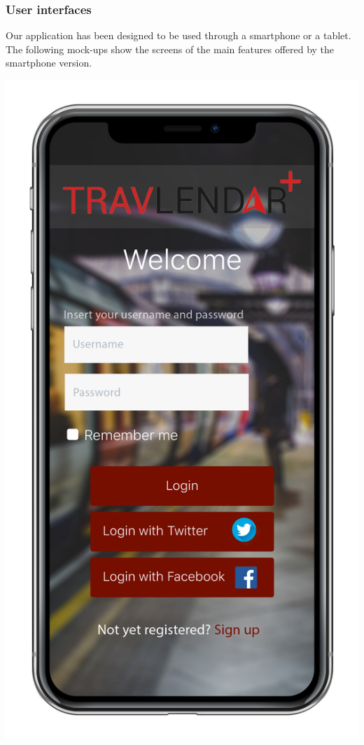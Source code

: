 \documentclass[12pt,titlepage]{article}
\begin{document}
\subsubsection{User interfaces}\label{sec:mod1}
Our application has been designed to be used through a smartphone or a tablet.
The following mock-ups show the screens of the main features offered by the smartphone version. 

\includegraphics[scale=0.15]{"iPhoneX_mockup LOGIN"}
\end{document}

